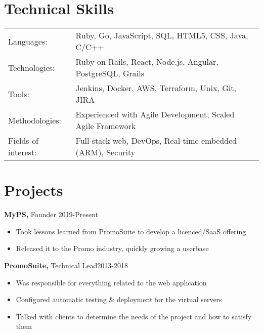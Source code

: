 \documentclass[line, centered]{res}
\begin{document}
\begin{resume}
\section{Technical Skills}
   \begin{tabular}{l l}
    Languages: & Ruby, Go, JavaScript, SQL, HTML5, CSS, Java, C/C++
    \\
    Technologies: &  Ruby on Rails, React, Node.js, Angular, PostgreSQL, Grails
    \\
    Tools: & Jenkins, Docker, AWS, Terraform, Unix, Git, JIRA
    \\
    Methodologies: & Experienced with Agile Development, Scaled Agile Framework
    \\
    Fields of interest: & Full-stack web, DevOps, Real-time embedded (ARM), Security
 \end{tabular}


\section{Projects}
{\bf MyPS,} Founder     \hfill 2019-Present
\begin{itemize} \itemsep -2pt
    \item Took lessons learned from PromoSuite to develop a licenced/SaaS offering
    \item Released it to the Promo industry, quickly growing a userbase
\end{itemize}

{\bf PromoSuite,} Technical Lead\hfill   2013-2018
\begin{itemize} \itemsep -2pt
    \item Was responsible for everything related to the web application
    \item Configured automatic testing \& deployment for the virtual servers
    \item Talked with clients to determine the needs of the project and how to satisfy them
\end{itemize}

\end{resume}
\end{document}
